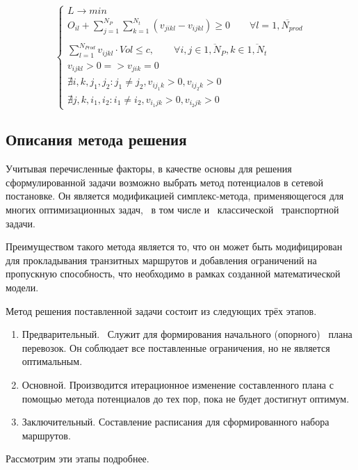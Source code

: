 	\begin{equation}
	\left\{ \begin{array}{ccc}	
		L \to min \\
		O_{il} + \sum_{j=1}^{N_P} \sum_{k=1}^{N_t} (v_{jikl} - v_{ijkl}) \ge 0 \qquad  \forall l = \overline{1, N_{prod}} \\
		\\
		\sum_{l=1}^{N_{Prod}} v_{ijkl} \cdot Vol \le c, \qquad \forall i, j \in \overline{1, N_P}, k \in \overline{1, N_t} \\
		v_{ijkl} > 0 => v_{jik} = 0 \\
		\nexists i, k, j_1, j_2: j_1 \ne j_2, v_{ij_1k} > 0, v_{ij_2k} > 0 \\
		\nexists j, k, i_1, i_2: i_1 \ne i_2, v_{i_1jk} > 0, v_{i_2jk} > 0 
	\end{array}	\right.
	\end{equation}

\subsection{Описания метода решения}
	Учитывая перечисленные факторы, в качестве основы для решения сформулированной задачи возможно выбрать метод потенциалов в сетевой постановке. Он является модификацией симплекс-метода, применяющегося для многих оптимизационных задач, \, в том числе и \, классической \, транспортной \, задачи\cite{trans:potential}.
		
	Преимуществом такого метода является то, что он может быть модифицирован для прокладывания транзитных маршрутов и добавления ограничений на пропускную способность, что необходимо в рамках созданной математической модели.
	
	Метод решения поставленной задачи состоит из следующих трёх этапов.
	\begin{enumerate}
		\item Предварительный. \, Служит для формирования начального (опорного) \, плана перевозок. Он соблюдает все поставленные ограничения, но не является оптимальным.
		\item Основной. Производится итерационное изменение составленного плана с помощью метода потенциалов до тех пор, пока не будет достигнут оптимум.
		\item Заключительный. Составление расписания для сформированного набора маршрутов.
	\end{enumerate} 

	Рассмотрим эти этапы подробнее.
	

